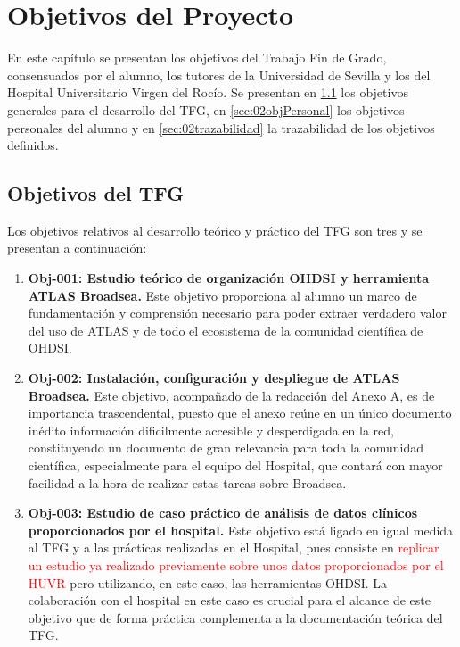 \chapter{Objetivos del Proyecto}\label{cap:02objetivos}

En este capítulo se presentan los objetivos del Trabajo Fin de Grado, consensuados por el alumno, los tutores de la Universidad de Sevilla y los del Hospital Universitario Virgen del Rocío. Se presentan en \ref{sec:02objTFG} los objetivos generales para el desarrollo del TFG, en \ref{sec:02objPersonal} los objetivos personales del alumno y en \ref{sec:02trazabilidad} la trazabilidad de los objetivos definidos.

\section{Objetivos del TFG} \label{sec:02objTFG}

Los objetivos relativos al desarrollo teórico y práctico del TFG son tres y se presentan a continuación:

%

\begin{enumerate}

    \item \textbf{Obj-001: Estudio teórico de organización OHDSI y herramienta ATLAS Broadsea.} Este objetivo proporciona al alumno un marco de fundamentación y comprensión necesario para poder extraer verdadero valor del uso de ATLAS y de todo el ecosistema de la comunidad científica de OHDSI.

    \item \textbf{Obj-002: Instalación, configuración y despliegue de ATLAS Broadsea.} Este objetivo, acompañado de la redacción del Anexo A, es de importancia trascendental, puesto que el anexo reúne en un único documento inédito información dificilmente accesible y desperdigada en la red, constituyendo un documento de gran relevancia para toda la comunidad científica, especialmente para el equipo del Hospital, que contará con mayor facilidad a la hora de realizar estas tareas sobre Broadsea.

    \item \textbf{Obj-003: Estudio de caso práctico de análisis de datos clínicos proporcionados por el hospital.} Este objetivo está ligado en igual medida al TFG y a las prácticas realizadas en el Hospital, pues consiste en \textcolor{red}{replicar un estudio ya realizado previamente sobre unos datos proporcionados por el HUVR} pero utilizando, en este caso, las herramientas OHDSI. La colaboración con el hospital en este caso es crucial para el alcance de este objetivo que de forma práctica complementa a la documentación teórica del TFG.

\end{enumerate}

